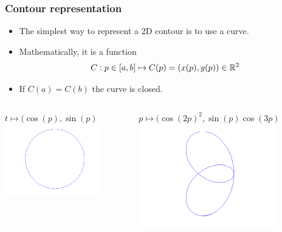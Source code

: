 \documentclass[10pt]{beamer}
\begin{document}
\begin{frame}
  \frametitle{Contour representation}
  \begin{itemize}
  \item The simplest way to represent a 2D contour is to use a curve.
  \item Mathematically, it is a function
    $$
    C: p\in[a,b] \mapsto C(p) = (x(p), y(p))\in {\mathbb R}^2
    $$
  \item If $C(a) = C(b)$ the curve is closed.
  \end{itemize}
  \begin{columns}
    \vspace{-5mm}
    \begin{center}
       $t\mapsto(\cos(p),\sin(p)$\\
    \includegraphics[width=0.8\textwidth]{FIGURES/simplecircle}
    \end{center}
    $p\mapsto(\cos(2p)^2,\sin(p)\cos(3p)$
    \includegraphics[width=0.8\textwidth]{FIGURES/butterfly}
  \end{columns}
\end{frame}
\end{document}
